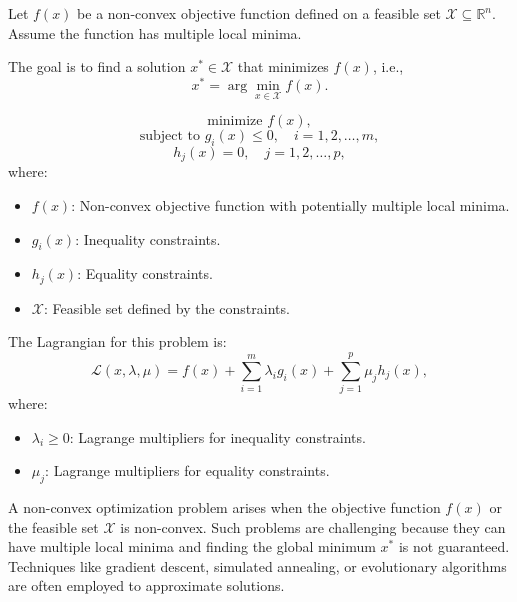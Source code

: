 
Let \( f(x) \) be a non-convex objective function defined on a feasible set \( \mathcal{X} \subseteq \mathbb{R}^n \). Assume the function has multiple local minima.

The goal is to find a solution \( x^* \in \mathcal{X} \) that minimizes \( f(x) \), i.e.,
\[
x^* = \arg \min_{x \in \mathcal{X}} f(x).
\]

\[
\text{minimize } f(x),
\]
\[
\text{subject to } g_i(x) \leq 0, \quad i = 1, 2, \ldots, m,
\]
\[
h_j(x) = 0, \quad j = 1, 2, \ldots, p,
\]
where:
\begin{itemize}
    \item \( f(x) \): Non-convex objective function with potentially multiple local minima.
    \item \( g_i(x) \): Inequality constraints.
    \item \( h_j(x) \): Equality constraints.
    \item \( \mathcal{X} \): Feasible set defined by the constraints.
\end{itemize}


The Lagrangian for this problem is:
\[
\mathcal{L}(x, \lambda, \mu) = f(x) + \sum_{i=1}^{m} \lambda_i g_i(x) + \sum_{j=1}^{p} \mu_j h_j(x),
\]
where:
\begin{itemize}
    \item \( \lambda_i \geq 0 \): Lagrange multipliers for inequality constraints.
    \item \( \mu_j \): Lagrange multipliers for equality constraints.
\end{itemize}

A non-convex optimization problem arises when the objective function \( f(x) \) or the feasible set \( \mathcal{X} \) is non-convex. Such problems are challenging because they can have multiple local minima and finding the global minimum \( x^* \) is not guaranteed. Techniques like gradient descent, simulated annealing, or evolutionary algorithms are often employed to approximate solutions.